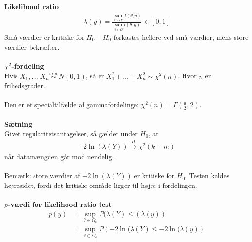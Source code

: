 \documentclass[12pt,a4paper]{report}
\begin{document}
\textbf{Likelihood ratio}\\
\begin{align*}
\lambda(y)=\frac{\sup_{\theta\in\Omega_0}l(\theta;y)}{\sup_{\theta\in\Omega}l(\theta;y)}\,\in[0,1]
\end{align*}
Små værdier er kritiske for $H_0$ -- $H_0$ forkastes hellere ved små værdier, mens store værdier bekræfter.\\\\
\textbf{$\chi^2$-fordeling}\\
Hvis $X_1,\ldots,X_n\overset{i.i.d.}\sim N(0,1)$, så er $X^2_1+\ldots+X_n^2\sim\chi^2(n)$. Hvor $n$ er frihedsgrader.\\\\
Den er et specialtilfælde af gammafordelinge: $\chi^2(n)=\Gamma(\frac{n}{2},2)$.\\\\
\textbf{Sætning}\\
Givet regularitetsantagelser, så gælder under $H_0$, at 
\begin{align*}
-2\ln(\lambda(Y))\overset{D}\to\chi^2(k-m)
\end{align*}
når datamængden går mod uendelig.\\\\
Bemærk: store værdier af $-2\ln(\lambda(Y))$ er kritiske for $H_0$. Testen kaldes højresidet, fordi det kritiske område ligger til højre i fordelingen.\\\\
\textbf{$p$-værdi for likelihood ratio test}
\begin{align*}
p(y)&=\sup_{\theta\in\Omega_0}P(\lambda(Y)\leq(\lambda(y))\\
&=\sup_{\theta\in\Omega_o}P\left(-2\ln(\lambda(Y)\leq-2\ln(\lambda(y)\right)
\end{align*}
\end{document}
